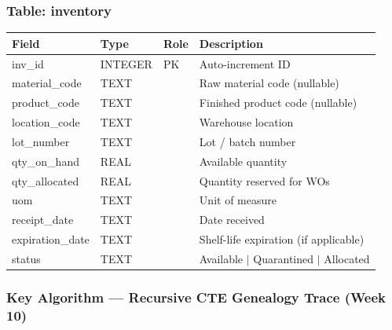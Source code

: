 \documentclass[11pt]{article}
\begin{document}
\subsubsection*{Table: inventory}
\begin{table}[H]\centering\small
\begin{tabular}{@{} l l l L{5.0cm} @{}}
\toprule
\textbf{Field} & \textbf{Type} & \textbf{Role} & \textbf{Description} \\
\midrule
inv\_id          & INTEGER & PK  & Auto-increment ID \\
material\_code   & TEXT    &     & Raw material code (nullable) \\
product\_code    & TEXT    &     & Finished product code (nullable) \\
location\_code   & TEXT    &     & Warehouse location \\
lot\_number      & TEXT    &     & Lot / batch number \\
qty\_on\_hand    & REAL    &     & Available quantity \\
qty\_allocated   & REAL    &     & Quantity reserved for WOs \\
uom             & TEXT    &     & Unit of measure \\
receipt\_date    & TEXT    &     & Date received \\
expiration\_date & TEXT    &     & Shelf-life expiration (if applicable) \\
status          & TEXT    &     & Available $\mid$ Quarantined $\mid$ Allocated \\
\bottomrule
\end{tabular}
\end{table}

\subsubsection*{Key Algorithm --- Recursive CTE Genealogy Trace (Week 10)}
\end{document}
